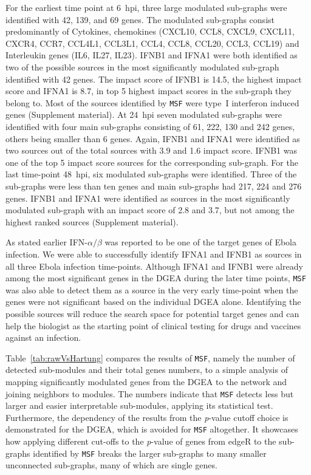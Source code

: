 \documentclass[10pt,a4paper,twocolumn]{article}
\begin{document}
	For the earliest time point at 6~hpi, three large modulated
        sub-graphs were identified with 42, 139, and 69 genes.  The
        modulated sub-graphs consist predominantly of Cytokines,
        chemokines (CXCL10, CCL8, CXCL9, CXCL11, CXCR4, CCR7, CCL4L1,
        CCL3L1, CCL4, CCL8, CCL20, CCL3, CCL19) and Interleukin genes
        (IL6, IL27, IL23).  IFNB1 and IFNA1 were both identified as
        two of the possible sources in the most significantly
        modulated sub-graph identified with 42 genes. The impact score
        of IFNB1 is 14.5, the highest impact score and IFNA1 is 8.7, in top 5 highest impact scores in the sub-graph they belong to. Most of the sources identified by \texttt{MSF}
        were type~I interferon induced genes (Supplement material).
        At 24~hpi seven modulated sub-graphs were identified with four
        main sub-graphs consisting of 61, 222, 130 and 242 genes,
        others being smaller than 6 genes. Again, IFNB1 and IFNA1 were
        identified as two sources out of the total sources with 3.9 
        and 1.6 impact score. IFNB1 was one of the top 5 impact score sources for the corresponding sub-graph. For the last time-point 48~hpi, six
        modulated sub-graphs were identified. Three of the sub-graphs
        were less than ten genes and main sub-graphs had 217, 224 and
        276 genes. IFNB1 and IFNA1 were identified as sources in the
        most significantly modulated sub-graph with an impact score of
        2.8 and 3.7, but not among the highest ranked sources (Supplement material). 
	
	As stated earlier IFN-$\alpha / \beta$ was reported to be one
        of the target genes of Ebola infection. We were able to
        successfully identify IFNA1 and IFNB1 as sources in all three
        Ebola infection time-points. Although IFNA1 and IFNB1 were
        already among the most significant genes in the DGEA during
        the later time points, \texttt{MSF} was also able to detect
        them as a source in the very early time-point when the genes
        were not significant based on the individual DGEA
        alone. Identifying the possible sources will reduce the search
        space for potential target genes and can help the biologist as
        the starting point of clinical testing for drugs and vaccines
        against an infection.
	
	Table~\ref{tab:rawVsHartung} compares the results of
        \texttt{MSF}, namely the number of detected sub-modules and
        their total genes numbers, to a simple analysis of mapping
        significantly modulated genes from the DGEA to the network and
        joining neighbors to modules. The numbers indicate that
        \texttt{MSF} detects less but larger and easier interpretable
        sub-modules, applying its statistical test. Furthermore, the
        dependency of the results from the \textit{p}-value cutoff
        choice is demonstrated for the DGEA, which is avoided for
        \texttt{MSF} altogether. It showcases how applying different
        cut-offs to the \textit{p}-value of genes from edgeR to the
        sub-graphs identified by \texttt{MSF} breaks the larger
        sub-graphs to many smaller unconnected sub-graphs, many of
        which are single genes.
	
\end{document}
